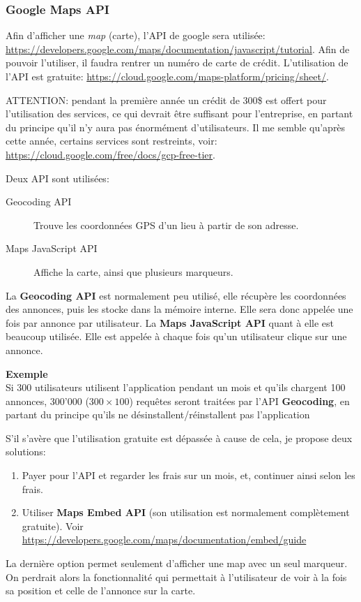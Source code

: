 \documentclass[french]{report}
\begin{document}
\subsubsection{Google Maps API}

Afin d'afficher une \textit{map} (carte), l'API de google sera utilisée:
\url{https://developers.google.com/maps/documentation/javascript/tutorial}. Afin de
pouvoir l'utiliser, il faudra rentrer un numéro de carte de crédit. L'utilisation
de l'API est gratuite: \url{https://cloud.google.com/maps-platform/pricing/sheet/}. 

ATTENTION: pendant la première année un crédit de 300\$ est offert pour
l'utilisation des services, ce qui devrait être suffisant pour l'entreprise, en
partant du principe qu'il n'y aura pas énormément d'utilisateurs. Il me semble
qu'après cette année, certains services sont restreints, voir: 
\url{https://cloud.google.com/free/docs/gcp-free-tier}.

Deux API sont utilisées:
\begin{description}
    \item[Geocoding API] Trouve les coordonnées GPS d'un lieu à partir de son adresse.
    \item[Maps JavaScript API] Affiche la carte, ainsi que plusieurs marqueurs.  
\end{description}
\vspace{1em}

La \textbf{Geocoding API} est normalement peu utilisé, elle récupère les
coordonnées des annonces, puis les stocke dans la mémoire interne. Elle sera donc
appelée une fois par annonce par utilisateur. La \textbf{Maps JavaScript API} quant
à elle est beaucoup utilisée. Elle est appelée à chaque fois qu'un utilisateur
clique sur une annonce.

\textbf{Exemple}\\
Si 300 utilisateurs utilisent l'application pendant un mois et qu'ils chargent 100
annonces, 300'000 ($300 \times 100$) requ\^etes seront traitées par l'API \textbf{Geocoding},
en partant du principe qu'ils ne désinstallent/réinstallent pas l'application

S'il s'avère que l'utilisation gratuite est dépassée à cause de cela, je propose
deux solutions:
\begin{enumerate}
    \item Payer pour l'API et regarder les frais sur un mois, et, continuer ainsi selon les frais.
    \item Utiliser \textbf{Maps Embed API} (son utilisation est normalement complètement gratuite). Voir \url{https://developers.google.com/maps/documentation/embed/guide}
\end{enumerate}
La dernière option permet seulement d'afficher une map avec un seul marqueur. On
perdrait alors la fonctionnalité qui permettait à l'utilisateur de voir à la fois
sa position et celle de l'annonce sur la carte.
\end{document}
